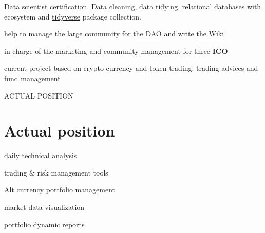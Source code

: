 Data scientist certification. Data cleaning, data tidying, relational databases with \Rlogo{} ecosystem and \href{https://www.tidyverse.org/}{tidyverse} package collection.

\vspace{\baselineskip}
\vspace{-0.5cm}

\begin{itemize}
  {
     \item[\faCaretRight] help to manage the large community for \href{https://en.wikipedia.org/wiki/The_DAO_(organization)}{the DAO} and write \href{https://daowiki.atlassian.net/wiki/spaces/DAO/pages/16744450/How-To+withdraw+funds+from+the+withdrawal+contract}{the Wiki}
     \item[\faCaretRight] in charge of the marketing and community management for three \textbf{ICO}
     \item[\faCaretRight] current project based on crypto currency and token trading: trading advices and fund management
   }
\end{itemize}


 ACTUAL POSITION

\section{Actual position}

\vspace{\baselineskip}

\begin{itemize}
\begin{multicols}{2}
  {
     \item[\faCaretRight] daily technical analysis
     \item[\faCaretRight] trading \& risk management tools
     \item[\faCaretRight] Alt currency portfolio management
     \item[\faCaretRight] market data visualization
     \item[\faCaretRight] portfolio dynamic reports
   }
\end{multicols}
\end{itemize}


